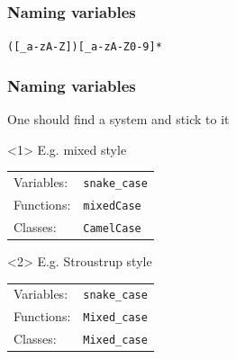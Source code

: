 \documentclass[14pt,a4paper,dvipsnames,usenames]{beamer}
\begin{document}
\begin{frame}[fragile]
  \frametitle{Naming variables}

  \begin{center}
    \verb/([_a-zA-Z])[_a-zA-Z0-9]*/
  \end{center}

 
\end{frame}

\begin{frame}[fragile]
  \frametitle{Naming variables}

  One should find a system and stick to it

  \vspace{1em}

  \begin{overlayarea}{\textwidth}{4cm}
  \begin{onlyenv}<1>
  E.g. mixed style

  \vspace{.5em}
  {\renewcommand{\arraystretch}{1.5}
    \begin{tabular}{ll}
    Variables: & \lstinline!snake_case! \\
    Functions: & \lstinline!mixedCase! \\
    Classes: & \lstinline!CamelCase!
    \end{tabular}
  }
  \end{onlyenv}

  \begin{onlyenv}<2>
  E.g. Stroustrup style

  \vspace{.5em}
  {\renewcommand{\arraystretch}{1.5}
    \begin{tabular}{ll}
    Variables: & \lstinline!snake_case! \\
    Functions: & \lstinline!Mixed_case! \\
    Classes: & \lstinline!Mixed_case!
    \end{tabular}
  }
  \end{onlyenv}
  \end{overlayarea}

\end{frame}
\end{document}
